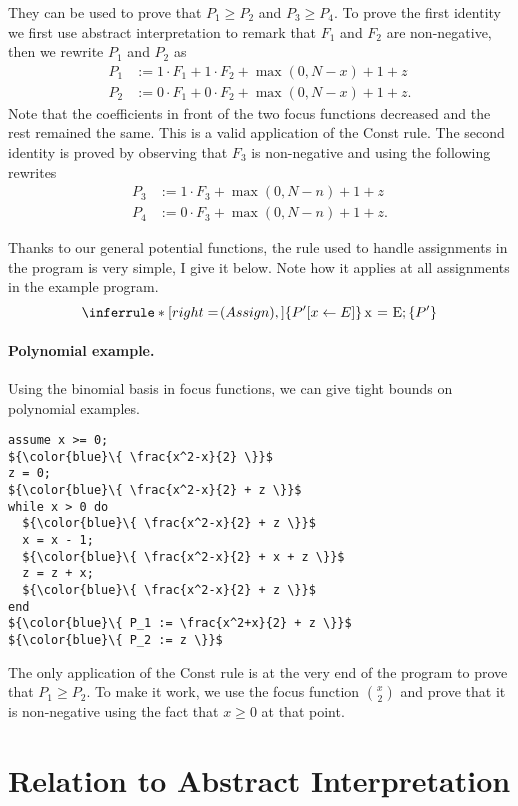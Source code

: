 \documentclass[nocopyrightspace,preprint]{sigplanconf-pldi15}
\begin{document}
They can be used to prove that $P_1 \ge P_2$ and $P_3 \ge P_4$.
To prove the first identity we first use abstract interpretation
to remark that $F_1$ and $F_2$ are non-negative, then we
rewrite $P_1$ and $P_2$ as
\begin{align*}
P_1 &:= 1 \cdot F_1 + 1 \cdot F_2 + \max(0, N-x) + 1 + z \\
P_2 &:= 0 \cdot F_1 + 0 \cdot F_2 + \max(0, N-x) + 1 + z.
\end{align*}
Note that the coefficients in front of the two focus functions
decreased and the rest remained the same.  This is a valid
application of the {\sc Const} rule.
The second identity is proved by observing that $F_3$ is
non-negative and using the following rewrites
\begin{align*}
P_3 &:= 1 \cdot F_3 + \max(0, N-n) + 1 + z \\
P_4 &:= 0 \cdot F_3 + \max(0, N-n) + 1 + z.
\end{align*}

Thanks to our general potential functions, the rule used to
handle assignments in the program is very simple, I give it below.
Note how it applies at all assignments in the example program.
$$
\Rule{Assign}
{ }
{\htriple{P'[x \gets E]}{\lstinline{x = E;}}{P'}}
$$

\paragraph{Polynomial example.} Using the binomial basis in
focus functions, we can give tight bounds on polynomial
examples.

\begin{lstlisting}[mathescape]
assume x >= 0;
${\color{blue}\{ \frac{x^2-x}{2} \}}$
z = 0;
${\color{blue}\{ \frac{x^2-x}{2} + z \}}$
while x > 0 do
  ${\color{blue}\{ \frac{x^2-x}{2} + z \}}$
  x = x - 1;
  ${\color{blue}\{ \frac{x^2-x}{2} + x + z \}}$
  z = z + x;
  ${\color{blue}\{ \frac{x^2-x}{2} + z \}}$
end
${\color{blue}\{ P_1 := \frac{x^2+x}{2} + z \}}$
${\color{blue}\{ P_2 := z \}}$
\end{lstlisting}

The only application of the {\sc Const} rule is at the very
end of the program to prove that $P_1 \ge P_2$.  To make it
work, we use the focus function $\binom{x}{2}$ and prove that
it is non-negative using the fact that $x \ge 0$ at that point.

\section{Relation to Abstract Interpretation}
\end{document}
